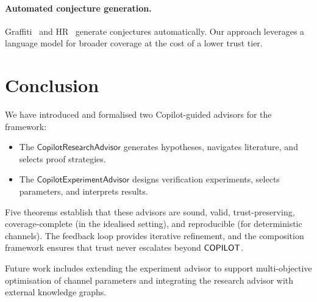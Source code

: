 \documentclass[11pt]{article}
\newcommand{\ResAdv}{\mathsf{CopilotResearchAdvisor}}
\newcommand{\ExpAdv}{\mathsf{CopilotExperimentAdvisor}}
\begin{document}
\paragraph{Automated conjecture generation.}
Graffiti~\cite{fajtlowicz1988graffiti} and
HR~\cite{colton2002hr} generate conjectures
automatically.  Our approach leverages a language
model for broader coverage at the cost of a lower
trust tier.

\section{Conclusion}\label{sec:conclusion}

We have introduced and formalised two Copilot-guided advisors
for the \JuGeo{} framework:
\begin{itemize}
\item The $\ResAdv$ generates hypotheses, navigates
      literature, and selects proof strategies.
\item The $\ExpAdv$ designs verification experiments,
      selects parameters, and interprets results.
\end{itemize}
Five theorems establish that these advisors are sound, valid,
trust-preserving, coverage-complete (in the idealised setting),
and reproducible (for deterministic channels).  The feedback
loop provides iterative refinement, and the composition
framework ensures that trust never escalates beyond $\mathsf{COPILOT}$.

Future work includes extending the experiment advisor to
support multi-objective optimisation of channel parameters
and integrating the research advisor with external knowledge
graphs.
\end{document}
